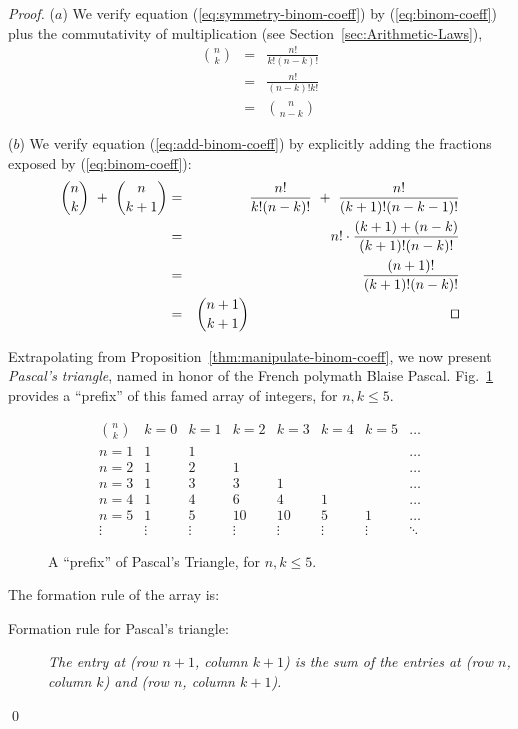 \begin{proof}
($a$)
We verify equation (\ref{eq:symmetry-binom-coeff}) by
(\ref{eq:binom-coeff}) plus the commutativity of multiplication (see
Section~\ref{sec:Arithmetic-Laws}),
\begin{eqnarray*}
{n \choose k} & = & \frac{n!}{k!(n-k)!} \\
              & = & \frac{n!}{(n-k)!k!} \\
              & = & {n \choose {n-k}}
\end{eqnarray*}

\noindent ($b$)
We verify equation (\ref{eq:add-binom-coeff}) by explicitly adding the
fractions exposed by (\ref{eq:binom-coeff}):
\begin{eqnarray*}
{n \choose k} \ + \ {n \choose {k+1}}
  & = &
\frac{n!}{k!(n-k)!} \ + \ \frac{n!}{(k+1)!(n-k-1)!} \\
  & = &
n! \cdot \frac{(k+1) + (n-k)} {(k+1)!(n-k)!} \\
  & = & 
\frac{(n+1)!}{(k+1)!(n-k)!} \\
  & = &
{{n+1} \choose {k+1}} \hspace*{2in} \qed
\end{eqnarray*}

Extrapolating from Proposition~\ref{thm:manipulate-binom-coeff}, we now
present {\it Pascal's triangle}, named in honor of
the French polymath Blaise Pascal.  Fig.~\ref{fig:pascal-triangle}
provides a ``prefix'' of this famed array of integers, for $n,k \leq
5$.
\begin{figure}[htb]
\[
\begin{array}{c||r|r|r|r|r|r|r}
{\displaystyle {n \choose k}} & k=0 & k=1 & k=2 & k=3 & k=4 & k=5 &\ldots \\
\hline
\hline
n=1 & 1 & 1 &    &    &    &   & \ldots \\
\hline
n=2 & 1 & 2 & 1  &    &    &   & \ldots \\
\hline
n=3 & 1 & 3 & 3  & 1  &    &   & \ldots \\
\hline
n=4 & 1 & 4 & 6  & 4  & 1  &   & \ldots \\
\hline
n=5 & 1 & 5 & 10 & 10 & 5  & 1 & \ldots \\
\hline
\vdots &\vdots &\vdots &\vdots &\vdots &\vdots &\vdots &\ddots
\end{array}
\]
\caption{A ``prefix'' of Pascal's Triangle, for $n,k \leq 5$.}
\label{fig:pascal-triangle}
\end{figure}
The formation rule of the array is:
\begin{description}
\item[\sf Formation rule for Pascal's triangle:]
% 
{\it The entry at (row $n+1$, column $k+1$) is the sum of the entries
  at (row $n$, column $k$) and (row $n$, column $k+1$).}
\end{description}
\qed
\end{proof}


